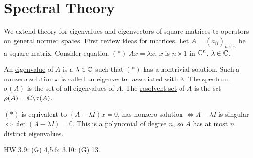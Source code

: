 \documentclass[]{article}
\begin{document}
\section*{Spectral Theory}
We extend theory for eigenvalues and eigenvectors of square matrices to operators on general normed spaces.
First review ideas for matrices. Let $A=(a_{ij})_{n\times n}$ be a square matrix.
Consider equation $(*)$ $Ax = \lambda x$, $x$ is $n\times 1$ in $\mathbb{C}^n$, $\lambda\in\mathbb{C}$.
\begin{definition}
	An \ul{eigenvalue} of $A$ is a $\lambda\in\mathbb{C}$ such that $(*)$ has a nontrivial solution.
	Such a nonzero solution $x$ is called an \ul{eigenvector} associated with $\lambda$.
	The \ul{spectrum} $\sigma(A)$ is the set of all eigenvalues of $A$.
	The \ul{resolvent set} of $A$ is the set $\rho(A)=\mathbb{C}\backslash\sigma(A)$.
\end{definition}
\begin{note}
	$(*)$ is equivalent to $(A-\lambda I)x=0$,
	has nonzero solution $\iff A-\lambda I$ is singular $\iff \det(A-\lambda I)=0$.
	This is a polynomial of degree $n$, so $A$ has at most $n$ distinct eigenvalues.
\end{note}

\ul{HW} 3.9: (G) 4,5,6; 3.10: (G) 13.
\end{document}
